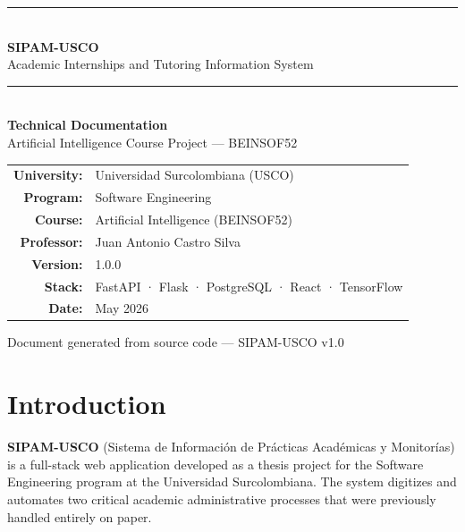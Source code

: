 \documentclass[12pt,a4paper]{article}
\begin{document}
\begin{titlepage}
  \centering
  \vspace*{1.5cm}
  {\color{vinotinto}\rule{\linewidth}{1.5pt}}\\[0.4cm]
  {\Huge\bfseries\color{vinotinto} SIPAM-USCO}\\[0.3cm]
  {\large Academic Internships and Tutoring Information System}\\[0.2cm]
  {\color{vinotinto}\rule{\linewidth}{1.5pt}}\\[0.8cm]
  {\LARGE\bfseries Technical Documentation}\\[0.4cm]
  {\large Artificial Intelligence Course Project — BEINSOF52}\\[1.8cm]
  \begin{tabular}{rl}
    \textbf{University:}    & Universidad Surcolombiana (USCO) \\[0.3cm]
    \textbf{Program:}       & Software Engineering \\[0.3cm]
    \textbf{Course:}        & Artificial Intelligence (BEINSOF52) \\[0.3cm]
    \textbf{Professor:}     & Juan Antonio Castro Silva \\[0.3cm]
    \textbf{Version:}       & 1.0.0 \\[0.3cm]
    \textbf{Stack:}         & FastAPI · Flask · PostgreSQL · React · TensorFlow \\[0.3cm]
    \textbf{Date:}          & May 2026 \\
  \end{tabular}
  \vfill
  {\color{grisusco}\small Document generated from source code — SIPAM-USCO v1.0}
\end{titlepage}

\tableofcontents
\newpage

\section{Introduction}

\textbf{SIPAM-USCO} (Sistema de Información de Prácticas Académicas y Monitorías) is a
full-stack web application developed as a thesis project for the Software Engineering program at
the Universidad Surcolombiana. The system digitizes and automates two critical academic
administrative processes that were previously handled entirely on paper.
\end{document}
